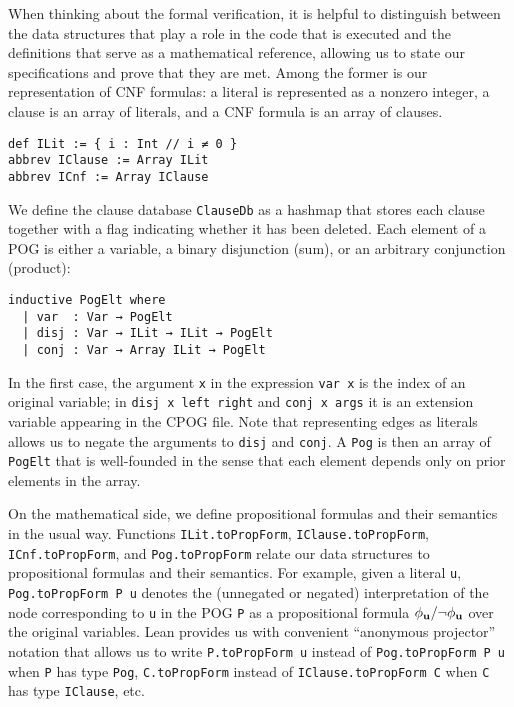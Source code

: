 When thinking about the formal verification, it is helpful to distinguish between
the data structures that play a role in the code that is
executed and the definitions that serve as a mathematical reference,
allowing us to state our specifications and prove that they are met.
Among the former is our representation of CNF formulas:
a literal is represented as a nonzero integer, a clause is an array of literals,
and a CNF formula is an array of clauses.
\begin{lstlisting}
def ILit := { i : Int // i ≠ 0 }
abbrev IClause := Array ILit
abbrev ICnf := Array IClause
\end{lstlisting}
We define the clause database {\tt ClauseDb} as a hashmap that
stores each clause together with a flag indicating whether it has
been deleted.
Each element of a POG is either a variable, a binary disjunction (sum),
or an arbitrary conjunction (product):
\begin{lstlisting}
inductive PogElt where
  | var  : Var → PogElt
  | disj : Var → ILit → ILit → PogElt
  | conj : Var → Array ILit → PogElt
\end{lstlisting}
In the first case, the argument \lstinline{x} in the expression
\lstinline{var x} is the index
of an original variable; in \lstinline{disj x left right} and \lstinline{conj x args}
it is an extension variable appearing in the CPOG file. Note that representing edges as literals
allows us to negate the arguments to \lstinline{disj} and \lstinline{conj}.
A \lstinline{Pog} is then an array of \lstinline{PogElt}
that is well-founded in the sense that each element depends only on prior elements
in the array.

On the mathematical side, we define propositional formulas and
their semantics in the usual way.
Functions \lstinline{ILit.toPropForm}, \lstinline{IClause.toPropForm},
\lstinline{ICnf.toPropForm}, and \lstinline{Pog.toPropForm}
relate our data structures to propositional formulas and their semantics.
For example, given a literal \lstinline{u}, \lstinline{Pog.toPropForm P u}
denotes the (unnegated or negated) interpretation of the node corresponding to \lstinline{u} in the POG
\lstinline{P} as a propositional formula $\phi_{\mathbf{u}}/\neg\phi_{\mathbf{u}}$ over the
original variables.
Lean provides us with convenient ``anonymous projector'' notation that allows
us to write \lstinline{P.toPropForm u} instead of \lstinline{Pog.toPropForm P u}
when \lstinline{P} has type \lstinline{Pog},
\lstinline{C.toPropForm} instead of \lstinline{IClause.toPropForm C} when \lstinline{C}
has type \lstinline{IClause}, etc.

